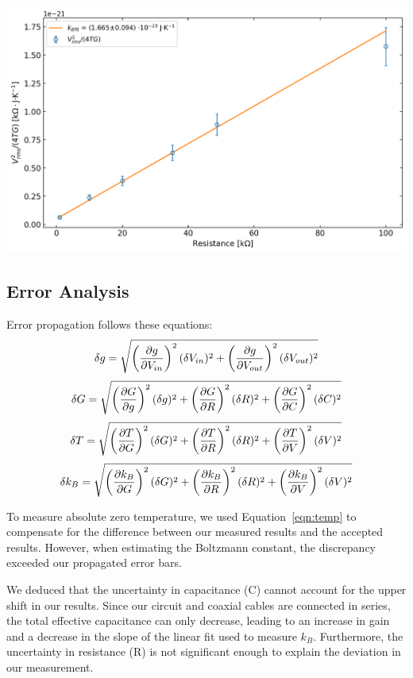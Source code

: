 \documentclass[a4paper]{tufte-handout}
\begin{document}
\includegraphics[width = 1\textwidth]{figures/therm_const.png}

\subsection{Error Analysis}
Error propagation follows these equations:
\begin{equation}
    \delta g = \sqrt{\left(\pdv{g}{V_{in}} \right)^2 (\delta V_{in})^2 + \left(\pdv{g}{V_{out}} \right)^2 (\delta V_{out})^2 } 
\end{equation}
\begin{equation}
    \delta G = \sqrt{\left(\pdv{G}{g} \right)^2 (\delta g)^2 + \left(\pdv{G}{R} \right)^2 (\delta R)^2  + \left(\pdv{G}{C} \right)^2 (\delta C)^2  }
\end{equation}
\begin{equation}
    \delta T = \sqrt{\left(\pdv{T}{G} \right)^2 (\delta G)^2 + \left(\pdv{T}{R} \right)^2 (\delta R)^2 + \left(\pdv{T}{V} \right)^2 (\delta V)^2} \label{eqn:temp}
\end{equation}
\begin{equation}
    \delta k_B = \sqrt{\left(\pdv{k_B}{G} \right)^2 (\delta G)^2 + \left(\pdv{k_B}{R} \right)^2 (\delta R)^2 + \left(\pdv{k_B}{V} \right)^2 (\delta V)^2}\label{eqn:therm}
\end{equation}

To measure absolute zero temperature, we used Equation~\ref{eqn:temp} to compensate for the difference between our measured results and the accepted results. However, when estimating the Boltzmann constant, the discrepancy exceeded our propagated error bars.

We deduced that the uncertainty in capacitance (C) cannot account for the upper shift in our results. Since our circuit and coaxial cables are connected in series, the total effective capacitance can only decrease, leading to an increase in gain and a decrease in the slope of the linear fit used to measure $k_B$. Furthermore, the uncertainty in resistance (R) is not significant enough to explain the deviation in our measurement.
\end{document}
